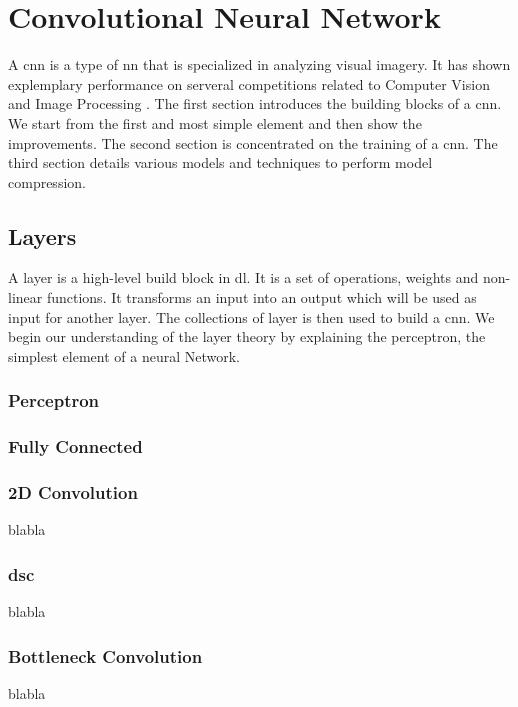     \chapter{Convolutional Neural Network} \label{chap:cnn}
A \acrfull{cnn} is a type of \acrlong{nn} that is specialized in analyzing visual imagery. It has shown explemplary performance on serveral competitions related to Computer Vision and Image Processing \cite{khan_survey_2020}. \newline \newline
The first section introduces the building blocks of a \acrshort{cnn}. We start from the first and most simple element and then show the improvements. \newline \newline
The second section is concentrated on the training of a \acrshort{cnn}. \newline \newline
The third section details various models and techniques to perform model compression.
    \section{Layers}
A layer is a high-level build block in \acrshort{dl}. It is a set of operations, weights and non-linear functions. It transforms an input into an output which will be used as input for another layer. The collections of layer is then used to build a \acrlong{cnn}. We begin our understanding of the layer theory by explaining the perceptron, the simplest element of a neural Network.
    \subsection{Perceptron} \label{subs:perceptron}
    
    \subsection{Fully Connected} \label{subs:fcl}
    
\subsection{2D Convolution} \label{subs:2dconv}
blabla
\subsection{\acrlong{dsc}}
blabla
\subsection{Bottleneck Convolution}
blabla
